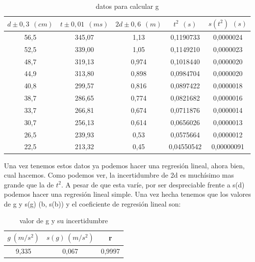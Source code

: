 \documentclass[12pt,a4paper]{book}
\begin{document}
\begin{table}[h] %
\begin{center}
\begin{tabular}{|c|c|c|c|c|}
\hline
$d  \pm 0,3 \ \ (cm)$ & 	 $t \pm 0,01 \ \ (ms)$ & 	 $2d  \pm 0,6 \ \ (m)$ & 	 $t^2  \ \ (s)$ & 	 $s(t^2) \ \ (s)$
 	\\ \hline
56,5 & 	 345,07 & 	 1,13 & 	 0,1190733 & 	 0,0000024
 	\\
52,5 & 	 339,00 & 	 1,05 & 	 0,1149210 & 	 0,0000023
 	\\
48,7 & 	 319,13 & 	 0,974 & 	 0,1018440 & 	 0,0000020
 	\\
44,9 & 	 313,80 & 	 0,898 & 	 0,0984704 & 	 0,0000020
 	\\
40,8 & 	 299,57 & 	 0,816 & 	 0,0897422 & 	 0,0000018
 	\\
38,7 & 	 286,65 & 	 0,774 & 	 0,0821682 & 	 0,0000016
 	\\
33,7 & 	 266,81 & 	 0,674 & 	 0,0711876 & 	 0,0000014
 	\\
30,7 & 	 256,13 & 	 0,614 & 	 0,0656026 & 	 0,0000013
 	\\
26,5 & 	 239,93 & 	 0,53 & 	 0,0575664 & 	 0,0000012
 	\\
22,5 & 	 213,32 & 	 0,45 & 	 0,04550542 & 	 0,00000091
 	\\ \hline
\end{tabular}
 \label{Tab:caida libre-datos para calcular g}
\caption{datos para calcular g}
\end{center}
\end{table}

Una vez tenemos estos datos ya podemos hacer una regresión lineal, ahora bien, cual hacemos. Como podemos ver, la incertidumbre de 2d es muchísimo mas grande que la de $t^2$. A pesar de que esta varíe, por ser despreciable frente a s(d) podemos hacer una regresión lineal simple. Una vez hecha tenemos que los valores de g y s(g) (b, s(b)) y el coeficiente de regresión lineal son:

\begin{table}[h] %
\begin{center}
\begin{tabular}{|c|c|c|}
\hline
$g \ (m/s^2)$ & 	 $s(g) \ (m/s^2)$ & 	 r \\ \hline
9,335 & 	 0,067 & 	 0,9997 \\  \hline
\end{tabular}
\label{Tab:caida libre-datos para calcular g}
\caption{valor de g y su incertidumbre}
\end{center}
\end{table}
\end{document}
